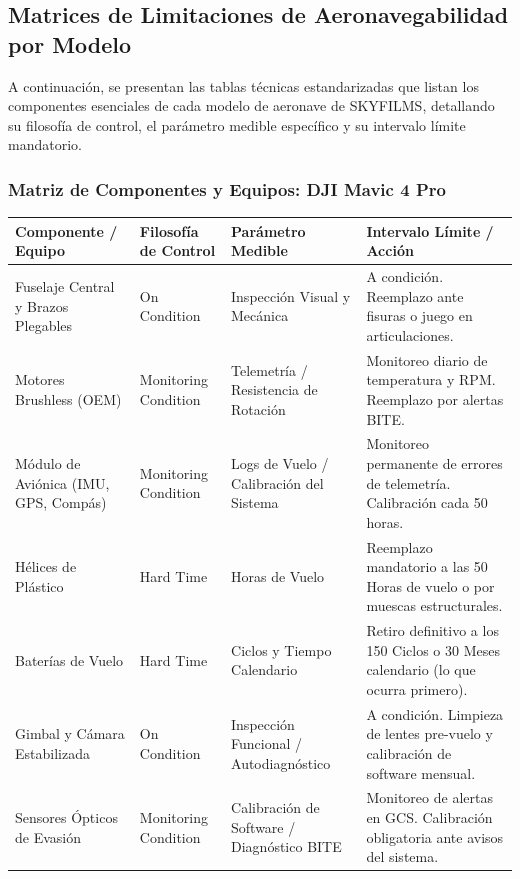 \subsection{Matrices de Limitaciones de Aeronavegabilidad por Modelo}
A continuación, se presentan las tablas técnicas estandarizadas que listan los componentes esenciales de cada modelo de aeronave de SKYFILMS, detallando su filosofía de control, el parámetro medible específico y su intervalo límite mandatorio.

\subsubsection{Matriz de Componentes y Equipos: DJI Mavic 4 Pro}

\begin{longtable}{|p{}|p{}|p{}|p{}|}
\hline
\rowcolor{gray!30}
\textbf{Componente / Equipo} & \textbf{Filosofía de Control} & \textbf{Parámetro Medible} & \textbf{Intervalo Límite / Acción} \\ \hline
\endhead

Fuselaje Central y Brazos Plegables & On Condition & Inspección Visual y Mecánica & A condición. Reemplazo ante fisuras o juego en articulaciones. \\ \hline
Motores Brushless (OEM) & Monitoring Condition & Telemetría / Resistencia de Rotación & Monitoreo diario de temperatura y RPM. Reemplazo por alertas BITE. \\ \hline
Módulo de Aviónica (IMU, GPS, Compás) & Monitoring Condition & Logs de Vuelo / Calibración del Sistema & Monitoreo permanente de errores de telemetría. Calibración cada 50 horas. \\ \hline
Hélices de Plástico & Hard Time & Horas de Vuelo & Reemplazo mandatorio a las 50 Horas de vuelo o por muescas estructurales. \\ \hline
Baterías de Vuelo & Hard Time & Ciclos y Tiempo Calendario & Retiro definitivo a los 150 Ciclos o 30 Meses calendario (lo que ocurra primero). \\ \hline
Gimbal y Cámara Estabilizada & On Condition & Inspección Funcional / Autodiagnóstico & A condición. Limpieza de lentes pre-vuelo y calibración de software mensual. \\ \hline
Sensores Ópticos de Evasión & Monitoring Condition & Calibración de Software / Diagnóstico BITE & Monitoreo de alertas en GCS. Calibración obligatoria ante avisos del sistema.
 \\ \hline
\end{longtable}

